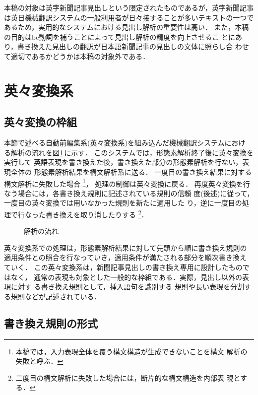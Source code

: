 本稿の対象は英字新聞記事見出しという限定されたものであるが，英字新聞記事
は英日機械翻訳システムの一般利用者が日々接することが多いテキストの一つで
あるため，実用的なシステムにおける見出し解析の重要性は高い．
また，本稿の目的はbe動詞を補うことによって見出し解析の精度を向上させるこ
とにあり，書き換えた見出しの翻訳が日本語新聞記事の見出しの文体に照らし合
わせて適切であるかどうかは本稿の対象外である．

\section{英々変換系}
\label{sec:preedit}

\subsection{英々変換の枠組}
\label{sec:preedit:flow}

本節で述べる自動前編集系(英々変換系)を組み込んだ機械翻訳システムにおけ
る解析の流れを図\ref{fig:flow}\,に示す．
このシステムでは，形態素解析終了後に英々変換を実行して
英語表現を書き換えた後，書き換えた部分の形態素解析を行ない，表現全体の
形態素解析結果を構文解析系に送る．
一度目の書き換え結果に対する構文解析に失敗した場合
\footnote{本稿では，入力表現全体を覆う構文構造が生成できないことを構文
解析の失敗と呼ぶ．}，
処理の制御は英々変換に戻る．
再度英々変換を行なう場合には，各書き換え規則に記述されている規則の信頼
度(後述)に従って，一度目の英々変換では用いなかった規則を新たに適用した
り，逆に一度目の処理で行なった書き換えを取り消したりする
\footnote{二度目の構文解析に失敗した場合には，断片的な構文構造を内部表
現とする．}．
\begin{figure}[htbp]
\begin{center}
\end{center}
\caption{解析の流れ}
\label{fig:flow}
\end{figure}

英々変換系での処理は，形態素解析結果に対して先頭から順に書き換え規則の
適用条件との照合を行なっていき，適用条件が満たされる部分を順次書き換え
ていく．
この英々変換系は，新聞記事見出しの書き換え専用に設計したものではなく，
通常の表現も対象とした一般的な枠組である．実際，見出し以外の表現に対す
る書き換え規則として，挿入語句を識別する
規則や長い表現を分割する規則などが記述されている．

\subsection{書き換え規則の形式}
\label{sec:preedit:ruleformat}

